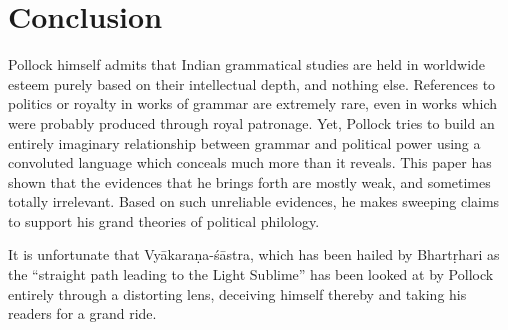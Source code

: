 \section*{Conclusion}

Pollock himself admits that Indian grammatical studies are held in worldwide esteem purely based on their intellectual depth, and nothing else. References to politics or royalty in works of grammar are extremely rare, even in works which were probably produced through royal patronage. Yet, Pollock tries to build an entirely imaginary relationship between grammar and political power using a convoluted language which conceals much more than it reveals. This paper has shown that the evidences that he brings forth are mostly weak, and sometimes totally irrelevant. Based on such unreliable evidences, he makes sweeping claims to support his grand theories of political philology. 

It is unfortunate that Vyākaraṇa-śāstra, which has been hailed by Bhartṛhari as the ``straight path leading to the Light Sublime'' has been looked at by Pollock entirely through a distorting lens, deceiving himself thereby and taking his readers for a grand ride. 

